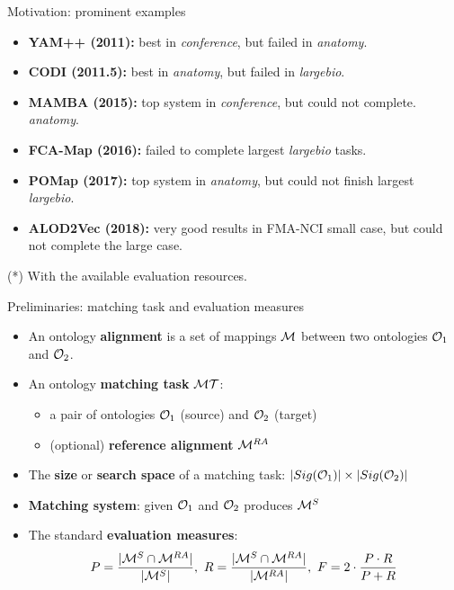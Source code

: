 \documentclass[t]{beamer}
\begin{document}
\begin{frame}{Motivation: prominent examples}

  		\begin{itemize}    
  			\item \textbf{YAM++ (2011):} best in \emph{conference}, but failed in
  			\emph{anatomy}.
            \item \textbf{CODI (2011.5):} best in \emph{anatomy}, but failed in
            \emph{largebio}.
            \item \textbf{MAMBA (2015):} top system in \emph{conference}, but
            could not complete. \emph{anatomy}.
            \item \textbf{FCA-Map (2016):} failed to complete largest
            \emph{largebio} tasks.
            \item \textbf{POMap (2017):} top system in \emph{anatomy}, but could
            not finish largest \emph{largebio}.
            \item \textbf{ALOD2Vec (2018):} very good results in FMA-NCI small
            case, but could not complete the large case\textbf{}.
		\end{itemize}
  	
  	(*) With the available evaluation resources.
  	
\end{frame}



\begin{frame}{Preliminaries: matching task and evaluation measures}
	
  		\begin{itemize}    
  			\item An ontology \textbf{alignment} is a
set of mappings $\mathcal{M}$ between two ontologies $\mathcal{O}_1$ and $\mathcal{O}_2$.
  			\item An ontology \textbf{matching task} $\mathcal{M}\mathcal{T}$:
  				\begin{itemize} 
  				  \item a pair of ontologies $\mathcal{O}_1$ (source) and $\mathcal{O}_2$ (target) 
  				  \item (optional) \textbf{reference alignment} $\mathcal{M}^{RA}$
  				 \end{itemize}
  			\item The \textbf{size} or \textbf{search space} of a matching task:
  			$\lvert Sig(\mathcal{O}_1) \rvert \times \lvert Sig(\mathcal{O}_2) \rvert$
  			
  			\item  \textbf{Matching system}: given $\mathcal{O}_1$ and $\mathcal{O}_2$ produces $\mathcal{M}^{S}$
  			\item The standard \textbf{evaluation measures}:
  			\begin{equation*}
    P = \frac{\lvert\mathcal{M}^{S} \cap \mathcal{M}^{RA}\rvert}{\lvert\mathcal{M}^{S}\rvert},~
    R = \frac{\lvert\mathcal{M}^{S} \cap \mathcal{M}^{RA}\rvert}{\lvert\mathcal{M}^{RA}\rvert},~
    F = 2 \cdot \frac{P \cdot R}{P + R} 
\end{equation*}
		\end{itemize}
  	
\end{frame}
\end{document}
